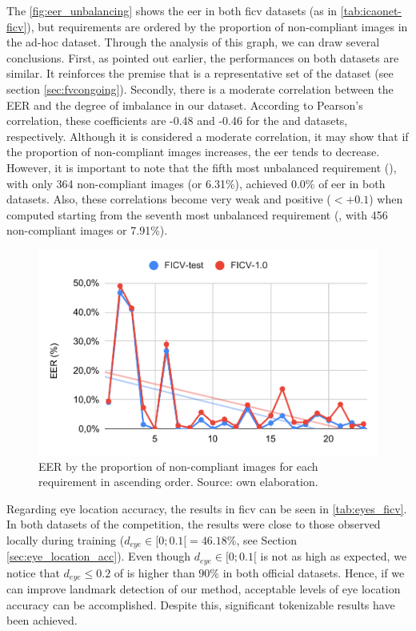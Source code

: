 The \autoref{fig:eer_unbalancing} shows the \acs{eer} in both \acs{ficv} datasets (as in \autoref{tab:icaonet-ficv}), but requirements are ordered by the proportion of non-compliant images in the ad-hoc dataset. Through the analysis of this graph, we can draw several conclusions. First, as pointed out earlier, the performances on both datasets are similar. It reinforces the premise that \ficvtest is a representative set of the \ficvofficial dataset (see section \ref{sec:fvcongoing}). Secondly, there is a moderate correlation between the EER and the degree of imbalance in our dataset. According to Pearson's correlation, these coefficients are -0.48 and -0.46 for the \ficvtest and \ficvofficial datasets, respectively. Although it is considered a moderate correlation, it may show that if the proportion of non-compliant images increases, the \acs{eer} tends to decrease. However, it is important to note that the fifth most unbalanced requirement (\veiloverface), with only 364 non-compliant images (or 6.31\%), achieved 0.0\% of \acs{eer} in both datasets. Also, these correlations become very weak and positive ($< +0.1$) when computed starting from the seventh most unbalanced requirement (\toodarklight, with 456 non-compliant images or 7.91\%).
 
\begin{figure}[htb]
\centering
\includegraphics[width=0.8\linewidth]{images/graphs/eer_unbalancing.pdf}
\caption{EER by the proportion of non-compliant images for each requirement in ascending order. Source: own elaboration.}
\label{fig:eer_unbalancing}
\end{figure}
 
Regarding eye location accuracy, the results in \acs{ficv} can be seen in \autoref{tab:eyes_ficv}. In both datasets of the competition, the results were close to those observed locally during training ($d_{eye} \in [0;0.1[ = 46.18\%$, see Section \ref{sec:eye_location_acc}). Even though $d_{eye} \in [0;0.1[$ is not as high as expected, we notice that $d_{eye} \leq 0.2$ of \methodname is higher than $90\%$ in both official datasets. Hence, if we can improve landmark detection of our method, acceptable levels of eye location accuracy can be accomplished. Despite this, significant tokenizable results have been achieved.
 
